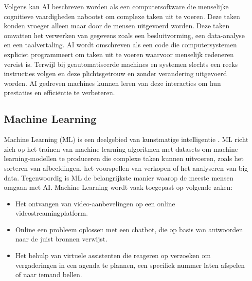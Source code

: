 Volgens \textcite{Coursera2024} kan AI beschreven worden als een computersoftware die menselijke cognitieve vaardigheden nabootst om complexe taken uit te voeren. Deze taken konden vroeger alleen maar door de mensen uitgevoerd worden. Deze taken omvatten het verwerken van gegevens zoals een besluitvorming, een data-analyse en een taalvertaling. AI wordt omschreven als een code die computersystemen expliciet programmeert om taken uit te voeren waarvoor menselijk redeneren vereist is. Terwijl bij geautomatiseerde machines en systemen slechts een reeks instructies volgen en deze plichtsgetrouw en zonder verandering uitgevoerd worden. AI gedreven machines kunnen leren van deze interacties om hun prestaties en efficiëntie te verbeteren. 

\subsection{Machine Learning}
Machine Learning (ML) is een deelgebied van kunstmatige intelligentie \autocite{Coursera2024}. ML richt zich op het trainen van machine learning-algoritmen met datasets om machine learning-modellen te produceren die complexe taken kunnen uitvoeren, zoals het sorteren van afbeeldingen, het voorspellen van verkopen of het analyseren van big data. Tegenwoordig is ML de belangrijkste manier waarop de meeste mensen omgaan met AI. Machine Learning wordt vaak toegepast op volgende zaken: 

\begin{itemize}
  \item Het ontvangen van video-aanbevelingen op een online videostreamingplatform.
  \item	Online een probleem oplossen met een chatbot, die op basis van antwoorden naar de juist bronnen verwijst.
  \item	Het behulp van virtuele assistenten die reageren op verzoeken om vergaderingen in een agenda te plannen, een specifiek nummer laten afspelen of naar iemand bellen.
\end{itemize}

